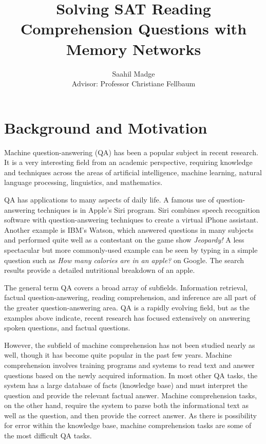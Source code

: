 \documentclass[pageno]{jpaper}
\begin{document}
\title{
Solving SAT Reading Comprehension Questions with Memory Networks}

\author{Saahil Madge\\Advisor: Professor Christiane Fellbaum}

\date{}
\maketitle

\thispagestyle{empty}
\doublespacing

\section{Background and Motivation}
\label{Background and Motivation}

Machine question-answering (QA) has been a popular subject in recent research.
It is a very interesting field from an academic perspective, requiring
knowledge and techniques across the areas of artificial intelligence, machine
learning, natural language processing, linguistics, and mathematics.

QA has applications to many aspects of daily life. A famous use of
question-answering techniques is in Apple's Siri program. Siri combines speech
recognition software with question-answering techniques to create a virtual
iPhone assistant. Another example is IBM's Watson, which answered questions in
many subjects and performed quite well as a contestant on the game show
\textit{Jeopardy!} A less spectacular but more commonly-used example can be seen
by typing in a simple question such as \textit{How many calories are in an
apple?} on Google. The search results provide a detailed nutritional breakdown
of an apple.

The general term QA covers a broad array of subfields. Information retrieval,
factual question-answering, reading comprehension, and inference are all part
of the greater question-answering area. QA is a rapidly evolving field, but as
the examples above indicate, recent research has focused extensively on
answering spoken questions, and factual questions.

However, the subfield of machine comprehension has not been studied nearly as
well, though it has become quite popular in the past few years. Machine
comprehension involves training programs and systems to read text and answer
questions based on the newly acquired information. In most other QA tasks, the
system has a large database of facts (knowledge base) and must interpret the
question and provide the relevant factual answer. Machine comprehension tasks,
on the other hand, require the system to parse both the informational text as
well as the question, and then provide the correct answer. As there is
possibility for error within the knowledge base, machine comprehension tasks
are some of the most difficult QA tasks.
\end{document}
